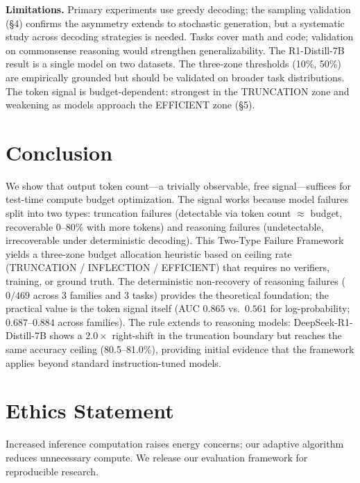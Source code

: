 \documentclass{article}
\begin{document}
\textbf{Limitations.}
Primary experiments use greedy decoding; the sampling validation (\S4) confirms the asymmetry extends to stochastic generation, but a systematic study across decoding strategies is needed. Tasks cover math and code; validation on commonsense reasoning would strengthen generalizability. The R1-Distill-7B result is a single model on two datasets. The three-zone thresholds (10\%, 50\%) are empirically grounded but should be validated on broader task distributions. The token signal is budget-dependent: strongest in the TRUNCATION zone and weakening as models approach the EFFICIENT zone (\S5).

\section{Conclusion}

We show that output token count---a trivially observable, free signal---suffices for test-time compute budget optimization. The signal works because model failures split into two types: truncation failures (detectable via token count $\approx$ budget, recoverable 0--80\% with more tokens) and reasoning failures (undetectable, irrecoverable under deterministic decoding). This Two-Type Failure Framework yields a three-zone budget allocation heuristic based on ceiling rate (TRUNCATION / INFLECTION / EFFICIENT) that requires no verifiers, training, or ground truth. The deterministic non-recovery of reasoning failures ($0/469$ across 3 families and 3 tasks) provides the theoretical foundation; the practical value is the token signal itself (AUC $0.865$ vs.\ $0.561$ for log-probability; $0.687$--$0.884$ across families). The rule extends to reasoning models: DeepSeek-R1-Distill-7B shows a $2.0\times$ right-shift in the truncation boundary but reaches the same accuracy ceiling (80.5--81.0\%), providing initial evidence that the framework applies beyond standard instruction-tuned models.

\section*{Ethics Statement}

Increased inference computation raises energy concerns; our adaptive algorithm reduces unnecessary compute. We release our evaluation framework for reproducible research.
\end{document}
